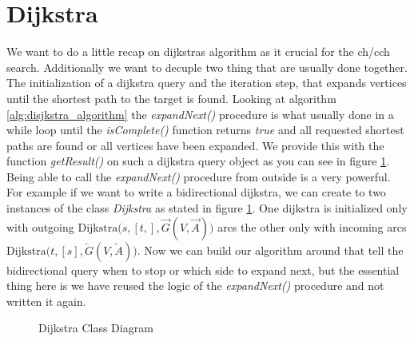 \section{Dijkstra}

We want to do a little recap on dijkstras algorithm as it crucial for the ch/cch search. Additionally we want to decuple two thing that are usually done together. The initialization of a dijkstra query and
the iteration step, that expands vertices until the shortest path to the target is found. Looking at algorithm \ref{alg:disjkstra_algorithm} the \textit{expandNext()} procedure is what usually done in a
while loop until the \textit{isComplete()} function returns \textit{true} and all requested shortest paths are found or all vertices have been expanded. We provide this with the function \textit{getResult()} 
on such a dijkstra query object as you can see in figure \ref{fig:dijkstra_class}. Being able to call the \textit{expandNext()} procedure from outside is a very powerful. For example if we want to write a bidirectional
dijkstra, we can create to two instances of the class \textit{Dijkstra} as stated in figure \ref{fig:dijkstra_class}. One dijkstra is initialized only with outgoing 
$\text{Dijkstra(}s, [t,], \overrightarrow{G}(V, \overrightarrow{A}) \text{)}$ arcs the other only with incoming arcs $\text{Dijkstra(}t, [s], \overleftarrow{G}(V, \overleftarrow{A}) \text{)}$. Now we can build our 
algorithm around that tell the bidirectional query when to stop or which side to expand next, but the essential thing here is we have reused the logic of the \textit{expandNext()} procedure and not written it again.




\begin{figure}
    \centering
    
    \caption{Dijkstra Class Diagram}
    \label{fig:dijkstra_class}
\end{figure}


